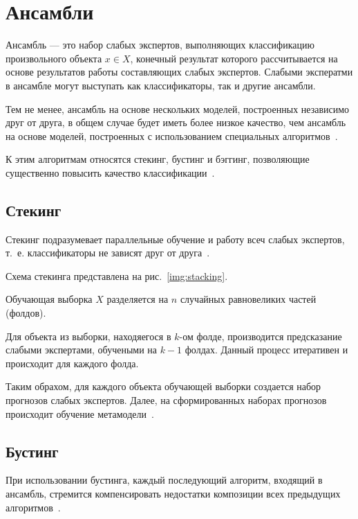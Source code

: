 \section{Ансамбли}

Ансамбль --- это набор слабых экспертов, выполняющих классификацию произвольного объекта $x \in X$, конечный результат которого рассчитывается на основе результатов работы составляющих слабых экспертов. Слабыми эксператми в ансамбле могут выступать как классификаторы, так и другие ансамбли.

Тем не менее, ансамбль на основе нескольких моделей, построенных независимо друг от друга, в общем случае будет иметь более низкое качество, чем ансамбль на основе моделей, построенных с использованием специальных алгоритмов~\cite{ensembles}.

К этим алгоритмам относятся стекинг, бустинг и бэггинг, позволяющие существенно повысить качество классификации~\cite{ensembles}.

\subsection{Стекинг}

Стекинг подразумевает параллельные обучение и работу всеч слабых экспертов, т.~е. классификаторы не зависят друг от друга~\cite{ensembles}. 

Схема стекинга представлена на рис.~\ref{img:stacking}.


Обучающая выборка $X$ разделяется на $n$ случайных равновеликих частей (фолдов).

Для объекта из выборки, находяегося в $k$-ом фолде, производится предсказание слабыми экспертами, обучеными на $k-1$ фолдах. Данный процесс итеративен и происходит для каждого фолда.

Таким обрахом, для каждого объекта обучающей выборки создается набор прогнозов слабых экспертов. Далее, на сформированных наборах прогнозов происходит обучение метамодели~\cite{ensembles}.

\subsection{Бустинг}

При использовании бустинга, каждый последующий алгоритм, входящий в ансамбль, стремится компенсировать недостатки композиции всех предыдущих алгоритмов~\cite{ensembles}.

